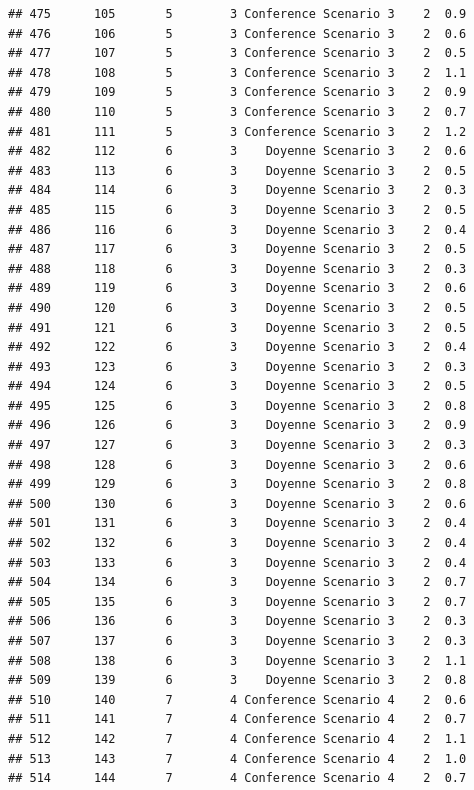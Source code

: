 \documentclass[
]{article}
\begin{document}
\begin{verbatim}
## 475      105       5        3 Conference Scenario 3    2  0.9
## 476      106       5        3 Conference Scenario 3    2  0.6
## 477      107       5        3 Conference Scenario 3    2  0.5
## 478      108       5        3 Conference Scenario 3    2  1.1
## 479      109       5        3 Conference Scenario 3    2  0.9
## 480      110       5        3 Conference Scenario 3    2  0.7
## 481      111       5        3 Conference Scenario 3    2  1.2
## 482      112       6        3    Doyenne Scenario 3    2  0.6
## 483      113       6        3    Doyenne Scenario 3    2  0.5
## 484      114       6        3    Doyenne Scenario 3    2  0.3
## 485      115       6        3    Doyenne Scenario 3    2  0.5
## 486      116       6        3    Doyenne Scenario 3    2  0.4
## 487      117       6        3    Doyenne Scenario 3    2  0.5
## 488      118       6        3    Doyenne Scenario 3    2  0.3
## 489      119       6        3    Doyenne Scenario 3    2  0.6
## 490      120       6        3    Doyenne Scenario 3    2  0.5
## 491      121       6        3    Doyenne Scenario 3    2  0.5
## 492      122       6        3    Doyenne Scenario 3    2  0.4
## 493      123       6        3    Doyenne Scenario 3    2  0.3
## 494      124       6        3    Doyenne Scenario 3    2  0.5
## 495      125       6        3    Doyenne Scenario 3    2  0.8
## 496      126       6        3    Doyenne Scenario 3    2  0.9
## 497      127       6        3    Doyenne Scenario 3    2  0.3
## 498      128       6        3    Doyenne Scenario 3    2  0.6
## 499      129       6        3    Doyenne Scenario 3    2  0.8
## 500      130       6        3    Doyenne Scenario 3    2  0.6
## 501      131       6        3    Doyenne Scenario 3    2  0.4
## 502      132       6        3    Doyenne Scenario 3    2  0.4
## 503      133       6        3    Doyenne Scenario 3    2  0.4
## 504      134       6        3    Doyenne Scenario 3    2  0.7
## 505      135       6        3    Doyenne Scenario 3    2  0.7
## 506      136       6        3    Doyenne Scenario 3    2  0.3
## 507      137       6        3    Doyenne Scenario 3    2  0.3
## 508      138       6        3    Doyenne Scenario 3    2  1.1
## 509      139       6        3    Doyenne Scenario 3    2  0.8
## 510      140       7        4 Conference Scenario 4    2  0.6
## 511      141       7        4 Conference Scenario 4    2  0.7
## 512      142       7        4 Conference Scenario 4    2  1.1
## 513      143       7        4 Conference Scenario 4    2  1.0
## 514      144       7        4 Conference Scenario 4    2  0.7

\end{verbatim}
\end{document}

